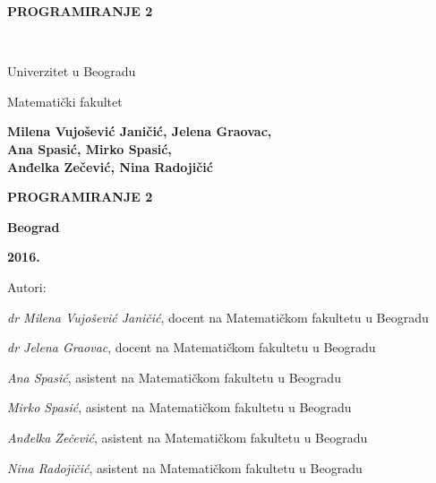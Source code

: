\pagestyle{empty}

\vspace*{20pt}
\centerline{{\large\bfseries PROGRAMIRANJE 2} \vspace*{2mm}}
\newpage
\verb" "
\newpage
\begin{center}
{\sffamily

{\fontsize{16pt}{19pt}\selectfont Univerzitet u Beogradu}

{\fontsize{16pt}{19pt}\selectfont Matematički fakultet}
\vspace{70pt}

{\fontsize{16pt}{19pt}\selectfont \bfseries  Milena Vujošević Janičić, Jelena Graovac,\\ Ana Spasić, Mirko Spasić,\\ \vspace*{1.5mm} Anđelka Zečević, Nina Radojičić}

\vspace{50pt}
\centerline{{\huge\bfseries PROGRAMIRANJE 2} \vspace*{2mm}}
\centerline{{\huge\bfseries {\fontsize{22pt}{26pt}\selectfont {Zbirka zadataka sa rešenjima}}}}


\vspace{120pt}

\centerline{{\Large \bfseries Beograd}}
\centerline{{\Large \bfseries 2016.}}

}
\end{center}



\newpage
\normalsize

\noindent
Autori: 

\noindent
{\slshape dr Milena Vujošević Janičić}, docent na Matematičkom fakultetu u Beogradu

\noindent
{\slshape dr Jelena Graovac}, docent na Matematičkom fakultetu u Beogradu

\noindent
{\slshape Ana Spasić}, asistent na Matematičkom fakultetu u Beogradu

\noindent
{\slshape Mirko Spasić}, asistent na Matematičkom fakultetu u Beogradu

\noindent
{\slshape Anđelka Zečević}, asistent na Matematičkom fakultetu u Beogradu

\noindent
{\slshape Nina Radojičić}, asistent na Matematičkom fakultetu u Beogradu
\vspace*{2mm}

